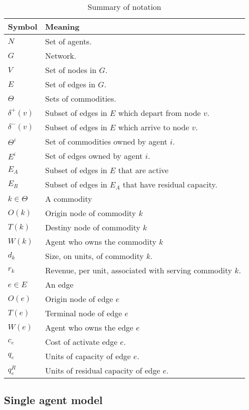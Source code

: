 \documentclass{article}
\begin{document}
\begin{table}[ht!]
	\caption{Summary of notation \label{tb:notation}}
	\begin{tabular}{|l|l|}
	\hline
	Symbol & Meaning	 \\ \hline
	$N$ & Set of agents. \\
	$G$ & Network. \\
	$V$ & Set of nodes in $G$. \\
	$E$ & Set of edges in $G$. \\
	$\Theta$ & Sets of commodities. \\
	$\delta^+(v)$ & Subset of edges in $E$ which depart from node $v$.\\
	$\delta^-(v)$ & Subset of edges in $E$ which arrive to node $v$.\\	
	$\Theta^i$ & Set of commodities owned by agent $i$. \\	
	$E^i$ & Set of edges owned by agent $i$.\\
	$E_A$ & Subset of edges in $E$ that are active \\
	$E_R$ & Subset of edges in $E_A$ that have residual capacity.\\
	$k \in \Theta$ & A commodity\\
	$O(k)$ & Origin node of commodity $k$\\
	$T(k)$ & Destiny node of commodity $k$\\
	$W(k)$ & Agent who owns the commodity $k$\\
	$d_k$ & Size, on units, of commodity $k$.\\
	$r_k$ & Revenue, per unit, associated with serving commodity $k$.\\
	$e\in E$ & An edge\\
	$O(e)$ & Origin node of edge $e$\\
	$T(e)$ & Terminal node of edge $e$\\
	$W(e)$ & Agent who owns the edge $e$\\
	$c_e$ & Cost of activate edge $e$. \\
	$q_e$ & Units of capacity of edge $e$. \\
	$q_e^R$ & Units of residual capacity of edge $e$.\\
	\hline
	\end{tabular}
\end{table}

\subsection{Single agent model}
\end{document}
